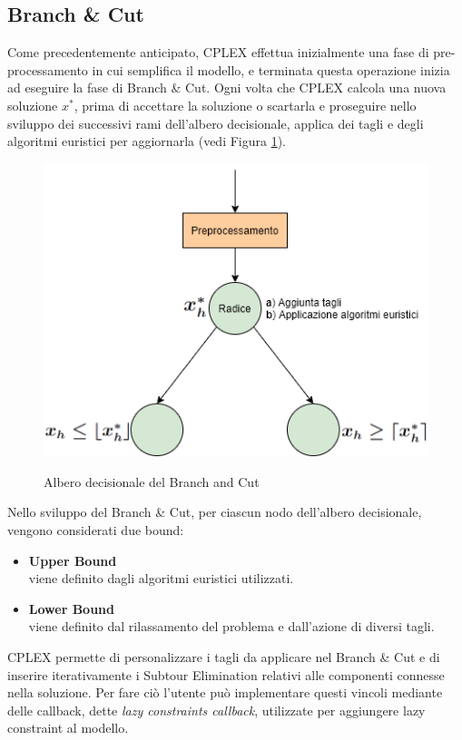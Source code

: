 \subsection{Branch \& Cut}
Come precedentemente anticipato, CPLEX effettua inizialmente una fase di pre-processamento in cui semplifica il modello, e terminata questa operazione inizia ad eseguire la fase di Branch \& Cut. Ogni volta che CPLEX calcola una nuova soluzione $x^*$, prima di accettare la soluzione o scartarla e proseguire nello sviluppo dei successivi rami dell'albero decisionale, applica dei tagli e degli algoritmi euristici per aggiornarla (vedi Figura \ref{Albero_decisionale}).\\
\begin{figure}[H] 
\begin{center} 
  \includegraphics[scale=0.6]{Images/albero_decisionale}\\ 
  \caption{\footnotesize{Albero decisionale del Branch and Cut}}
  \label{Albero_decisionale} 
\end{center} 
\end{figure}
Nello sviluppo del Branch \& Cut, per ciascun nodo dell'albero decisionale, vengono considerati due bound:
\begin{itemize}
\item{\textbf{Upper Bound}\\
viene definito dagli algoritmi euristici utilizzati.
}
\item{\textbf{Lower Bound}\\
viene definito dal rilassamento del problema e dall'azione di diversi tagli.
}
\end{itemize}
CPLEX permette di personalizzare i tagli da applicare nel Branch \& Cut e di inserire iterativamente i Subtour Elimination relativi alle componenti connesse nella soluzione. Per fare ciò l'utente può implementare questi vincoli mediante delle callback, dette \textit{lazy constraints callback}, utilizzate per aggiungere lazy constraint al modello.\\
